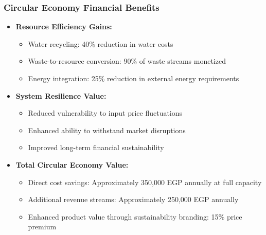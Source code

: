 \subsubsection{Circular Economy Financial Benefits}
\begin{itemize}
    \item \textbf{Resource Efficiency Gains:}
    \begin{itemize}
        \item Water recycling: 40\% reduction in water costs
        \item Waste-to-resource conversion: 90\% of waste streams monetized
        \item Energy integration: 25\% reduction in external energy requirements
    \end{itemize}
    
    \item \textbf{System Resilience Value:}
    \begin{itemize}
        \item Reduced vulnerability to input price fluctuations
        \item Enhanced ability to withstand market disruptions
        \item Improved long-term financial sustainability
    \end{itemize}
    
    \item \textbf{Total Circular Economy Value:}
    \begin{itemize}
        \item Direct cost savings: Approximately 350,000 EGP annually at full capacity
        \item Additional revenue streams: Approximately 250,000 EGP annually
        \item Enhanced product value through sustainability branding: 15\% price premium
    \end{itemize}
\end{itemize}

